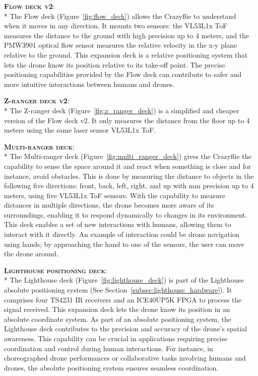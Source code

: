 {\bfseries \scshape Flow deck v2}\label{deck:flow}:\\*
The Flow deck (Figure~\ref{fig:flow_deck}) allows the Crazyflie to understand when it moves in any direction. 
It mounts two sensors: the VL53L1x ToF measures the distance to the ground with high precision up to 4 meters, and the PMW3901 optical flow sensor measures the relative velocity in the x-y plane relative to the ground. 
This expansion deck is a relative positioning system that lets the drone know its position relative to its take-off point.
The precise positioning capabilities provided by the Flow deck can contribute to safer and more intuitive interactions between humans and drones.

{\bfseries \scshape Z-ranger deck v2}\label{deck:z_ranger}:\\*
The Z-ranger deck (Figure~\ref{fig:z_ranger_deck}) is a simplified and cheaper version of the Flow deck v2.
It only measures the distance from the floor up to 4 meters using the same laser sensor VL53L1x ToF.

{\bfseries \scshape Multi-ranger deck}\label{deck:multi_ranger}:\\*
The Multi-ranger deck (Figure~\ref{fig:multi_ranger_deck}) gives the Crazyflie the capability to sense the space around it and react when something is close and for instance, avoid obstacles.
This is done by measuring the distance to objects in the following five directions: front, back, left, right, and up with mm precision up to 4 meters, using five VL53L1x ToF sensors.
With the capability to measure distances in multiple directions, the drone becomes more aware of its surroundings, enabling it to respond dynamically to changes in its environment. 
This deck enables a set of new interactions with humans, allowing them to interact with it directly. 
An example of interaction could be drone navigation using hands; by approaching the hand to one of the sensors, the user can move the drone around.

{\bfseries \scshape Lighthouse positioning deck}\label{deck:lighthouse}:\\*
The Lighthouse deck (Figure~\ref{fig:lighthouse_deck}) is part of the Lighthouse absolute positioning system (See Section~\ref{subsec:lighthouse_hardware}). 
It comprises four TS4231 IR receivers and an ICE40UP5K FPGA to process the signal received.
This expansion deck lets the drone know its position in an absolute coordinate system.
As part of an absolute positioning system, the Lighthouse deck contributes to the precision and accuracy of the drone's spatial awareness. 
This capability can be crucial in applications requiring precise coordination and control during human interactions.
For instance, in choreographed drone performances or collaborative tasks involving humans and drones, the absolute positioning system ensures seamless coordination.

